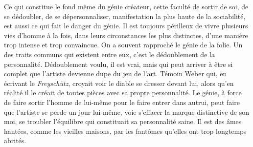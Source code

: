 \documentclass[french,twoside]{book} %
\begin{document}
Ce qui constitue le fond même du génie créateur, cette faculté de sortir de soi, de se dédoubler, de se dépersonnaliser, manifestation la plus haute de la sociabilité, est aussi ce qui fait le danger du génie. Il est toujours périlleux de vivre plusieurs vies d’homme à la fois, dans leurs circonstances les plus distinctes, d’une manière trop intense et trop convaincue. On a souvent rapproché le génie de la folie. Un des traits communs qui existent entre eux, c’est le dédoublement de la personnalité. Dédoublement voulu, il est vrai, mais qui peut arriver à être si complet que l’artiste devienne dupe du jeu de l’art. Témoin Weber qui, en écrivant le \emph{Freyschütz}, croyait voir le diable se dresser devant lui, alors qu’en réalité il le créait de toutes pièces avec sa propre personnalité. Le génie, à force de faire sortir l’homme de lui-même pour le faire entrer dans autrui, peut faire que l’artiste se perde un jour lui-même, voie s’effacer la marque distinctive de son moi, se troubler l’équilibre qui constituait sa personnalité saine. Il est des âmes hantées, comme les vieilles maisons, par les fantômes qu’elles ont trop longtemps abrités.
\end{document}
